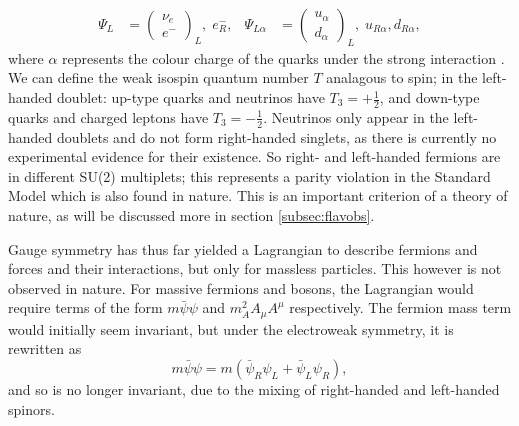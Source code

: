 \documentclass[a4paper,12pt]{article}
\begin{document}
\begin{align}
    \label{eq:doublet}
    \Psi_L &=\begin{pmatrix} \nu_e \\ e^- \end{pmatrix}_L,\; e_R^-, & \Psi_{L\alpha} &=\begin{pmatrix} u_\alpha \\ d_\alpha\end{pmatrix}_L,\; u_{R\alpha},d_{R\alpha},
\end{align}
where $\alpha$ represents the colour charge of the quarks under the strong interaction \cite{m}.
We can define the weak isospin quantum number $T$ analagous to spin; in the left-handed doublet: up-type quarks and neutrinos have $T_3=+\frac12$, and down-type quarks and charged leptons have $T_3=-\frac12$.
Neutrinos only appear in the left-handed doublets and do not form right-handed singlets, as there is currently no experimental evidence for their existence.
So right- and left-handed fermions are in different SU(2) multiplets; this represents a parity violation in the Standard Model which is also found in nature. 
This is an important criterion of a theory of nature, as will be discussed more in section \ref{subsec:flavobs}.

Gauge symmetry has thus far yielded a Lagrangian to describe fermions and forces and their interactions, but only for massless particles. 
This however is not observed in nature. 
For massive fermions and bosons, the Lagrangian would require terms of the form $m\bar{\psi}\psi$ and $m_A^2A_\mu A^\mu$ respectively.
The fermion mass term would initially seem invariant, but under the electroweak symmetry, it is rewritten as
\begin{equation}
    \label{eq:mass}
    m\bar{\psi}\psi = m(\bar{\psi}_R\psi_L+\bar{\psi}_L\psi_R),
\end{equation}
and so is no longer invariant, due to the mixing of right-handed and left-handed spinors. 
\end{document}
